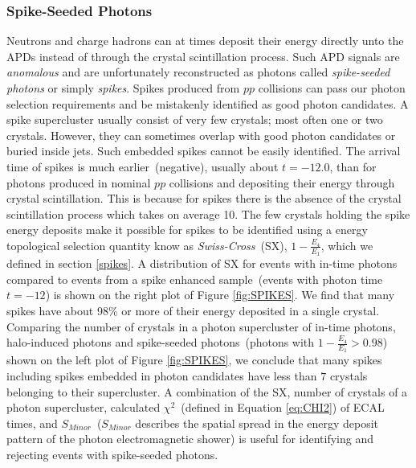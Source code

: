 \subsubsection{Spike-Seeded Photons}
Neutrons and charge hadrons can at times deposit their energy directly unto the APDs instead of through the crystal scintillation process. Such APD signals are \textit{anomalous} and are unfortunately reconstructed as photons called \textit{spike-seeded photons} or simply \textit{spikes}. Spikes produced from $pp$ collisions can pass our photon selection requirements and be mistakenly identified as good photon candidates. A spike supercluster usually consist of very few crystals; most often one or two crystals. However, they can sometimes overlap with good photon candidates or buried inside jets. Such embedded spikes cannot be easily identified. 
\newline
The arrival time of spikes is much earlier~(negative), usually about $t = -12.0$\ns, than for photons produced in nominal $pp$ collisions and depositing their energy through crystal scintillation. This is because for spikes there is the absence of the crystal scintillation process which takes on average 10\ns. The few crystals holding the spike energy deposits make it possible for spikes to be identified using a energy topological selection quantity know as \textit{Swiss-Cross}~(SX), $1-\frac{E_{4}}{E_{1}}$, which we defined in section \ref{spikes}. A distribution of SX for events with in-time photons compared to events from a spike enhanced sample~(events with photon time $t = -12$\ns) is shown on the right plot of Figure \ref{fig:SPIKES}. We find that many spikes have about 98\% or more of their energy deposited in a single crystal.
\newline
Comparing the number of crystals in a photon supercluster of in-time photons, halo-induced photons and spike-seeded photons~(photons with $1-\frac{E_{4}}{E_{1}} > 0.98$) shown on the left plot of Figure \ref{fig:SPIKES}, we conclude that many spikes including spikes embedded in photon candidates have less than $7$ crystals belonging to their supercluster. A combination of the SX, number of crystals of a photon supercluster, calculated $\chi^{2}$~(defined in Equation \ref{eq:CHI2}) of ECAL times, and $ S_{Minor}$~($ S_{Minor}$ describes the spatial spread in the energy deposit pattern of the photon electromagnetic shower) is useful for identifying and rejecting events with spike-seeded photons.

